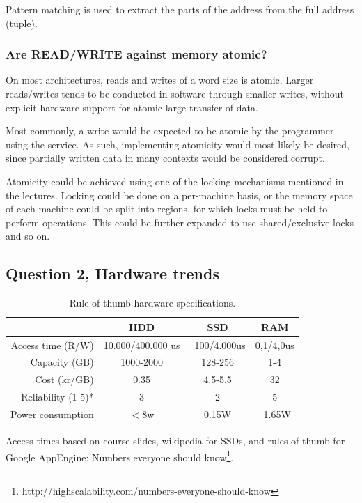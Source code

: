 \documentclass[11pt,a4paper]{article}
\begin{document}
Pattern matching is used to extract the parts of the address from the full
address (tuple).

\subsubsection{Are READ/WRITE against memory atomic?}
On most architectures, reads and writes of a word size is atomic. Larger 
reads/writes tends to be conducted in software through smaller writes,
without explicit hardware support for atomic large transfer of data.

Most commonly, a write would be expected to be atomic by the programmer using
the service. As such, implementing atomicity would most likely be desired, since
partially written data in many contexts would be considered corrupt.

Atomicity could be achieved using one of the locking mechanisms mentioned
in the lectures. Locking could be done on a per-machine basis, or the
memory space of each machine could be split into regions, for which locks
must be held to perform operations. This could be further expanded to use
shared/exclusive locks and so on.

\subsection{Question 2, Hardware trends}

\begin{table}[h!]
    \centering

    \begin{tabular}{|r|c|c|c|}
        \hline
                               & HDD & SSD & RAM\\\hline
        Access time (R/W)  & 10.000/400.000 us & ~100/4.000us & 0,1/4,0us\\\hline %
        Capacity (GB) & 1000-2000 & 128-256 & 1-4 \\\hline
        Cost (kr/GB)   & 0.35 & 4.5-5.5 & 32 \\\hline
        Reliability (1-5)*& 3 & 2 & 5\\\hline %
        Power consumption & $<$8w & 0.15W & ~1.65W \\\hline 
        
    \end{tabular}
    \caption{Rule of thumb hardware specifications.}
\end{table}
Access times based on course slides, wikipedia for SSDs, and rules of thumb
for Google AppEngine: Numbers everyone should know\footnote{http://highscalability.com/numbers-everyone-should-know}.
\end{document}
